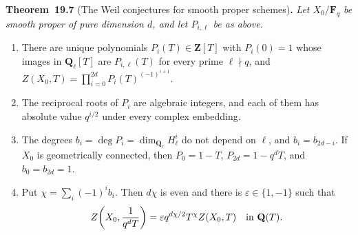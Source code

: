 \documentclass[11pt]{article}
\newenvironment{bpstatement}[2]{\par\addvspace{0.6\baselineskip}\noindent\textbf{#1}#2\textbf{.}\enspace\ignorespaces}
  {\par\addvspace{0.4\baselineskip}}
\newenvironment{bpstatementit}[2]{\begin{bpstatement}{#1}{#2}\itshape\ignorespaces}{\end{bpstatement}}
\begin{document}
\label{bp24}%
\begin{bpstatementit}{Theorem~19.7}{ (The Weil conjectures for smooth proper schemes)}
Let \(X_0/\mathbf F_q\) be smooth proper of pure dimension \(d\), and let \(P_{i,\ell}\) be as above.

\begin{enumerate}
\item There are unique polynomials \(P_i(T)\in\mathbf Z[T]\) with \(P_i(0)=1\) whose images in \(\mathbf Q_\ell[T]\) are \(P_{i,\ell}(T)\) for every prime \(\ell\nmid q\), and \(Z(X_0,T)=\prod_{i=0}^{2d}P_i(T)^{(-1)^{i+1}}\).
\item The reciprocal roots of \(P_i\) are algebraic integers, and each of them has absolute value \(q^{i/2}\) under every complex embedding.
\item The degrees \(b_i=\deg P_i=\dim_{\mathbf Q_\ell}H^i_\ell\) do not depend on \(\ell\), and \(b_i=b_{2d-i}\). If \(X_0\) is geometrically connected, then \(P_0=1-T\), \(P_{2d}=1-q^dT\), and \(b_0=b_{2d}=1\).
\item Put \(\chi=\sum_i(-1)^ib_i\). Then \(d\chi\) is even and there is \(\varepsilon\in\{1,-1\}\) such that \[
   Z\!\left(X_0,\frac1{q^dT}\right)
   =\varepsilon q^{d\chi/2}T^\chi Z(X_0,T)
   \quad\hbox{in }\mathbf Q(T).
   \]
\end{enumerate}
\end{bpstatementit}
\end{document}
